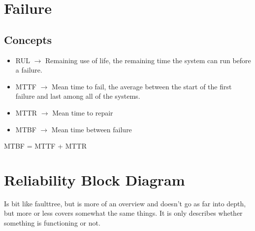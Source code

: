 \section{Failure}


\subsection{Concepts}
\begin{itemize}
	\item RUL $\rightarrow$ Remaining use of life, the remaining time the system can run before a failure.
	\item MTTF $\rightarrow$ Mean time to fail, the average between the start of the first failure and last among all of the systems.
	\item MTTR $\rightarrow$ Mean time to repair
	\item MTBF $\rightarrow$ Mean time between failure
\end{itemize}

MTBF = MTTF + MTTR
\\


\section{Reliability Block Diagram}
Is bit like faulttree, but is more of an overview and doesn't go as far into depth, but more or less covers somewhat the same things. It is only describes whether something is functioning or not.

